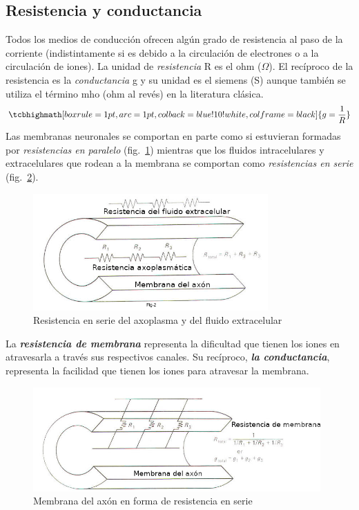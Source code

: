 \subsection{Resistencia y conductancia}\label{sec:resistencia_conductancia}
Todos los medios de conducción ofrecen algún grado de resistencia al paso de la corriente (indistintamente si es debido a la circulación de electrones o a la circulación de iones). La unidad de \textit{resistencia} R es el ohm ($\Omega$). El recíproco de la resistencia es la \textit{conductancia} g y su unidad es el siemens (S) aunque también se utiliza el término mho (ohm al revés) en la literatura clásica.
\begin{equation}
    \tcbhighmath[boxrule=1pt,arc=1pt,colback=blue!10!white,colframe=black]{g=\frac{1}{R}}
\end{equation}
Las membranas neuronales se comportan en parte como si estuvieran formadas por \textit{resistencias en paralelo} (fig.~\ref{fig:resistencia_fluidos}) mientras que los fluidos intracelulares y extracelulares que rodean a la membrana se comportan como \textit{resistencias en serie} (fig.~\ref{fig:resistencia_membrana}).
\begin{figure}[htbp!]
    \centering
    \includegraphics[width=9.0cm]{figures/Resistencia_Fluidos.png}
    \caption{Resistencia en serie del axoplasma y del fluido extracelular}
    \label{fig:resistencia_fluidos}
\end{figure}
La \textbf{\emph{resistencia de membrana}} representa la dificultad que tienen los iones en atravesarla a través sus respectivos canales. Su recíproco, \textbf{\emph{la conductancia}}, representa la facilidad que tienen los iones para atravesar la membrana.
\begin{figure}[htbp!]
            \centering 
            \includegraphics[width=11.0cm]{figures/Resistencia_Membrana.png}
            \caption{Membrana del axón en forma de resistencia en serie}
            \label{fig:resistencia_membrana}
\end{figure}

